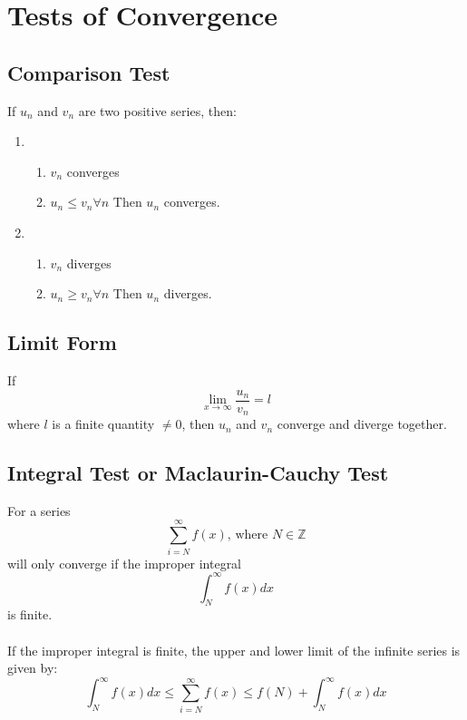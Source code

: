 \documentclass[openany, oneside]{book}
\begin{document}
\section{Tests of Convergence}
\subsection{Comparison Test}
If $u_n$ and $v_n$ are two positive series, then:
\begin{enumerate}
\item \begin{enumerate}
\item $v_n$ converges
\item $u_n\leq v_n \forall n$
Then $u_n$ converges.
\end{enumerate}
\item \begin{enumerate}
\item $v_n$ diverges
\item $u_n\geq v_n \forall n$
Then $u_n$ diverges.
\end{enumerate}
\end{enumerate}

\subsection{Limit Form}
If \begin{equation}\lim_{x\to\infty} \dfrac{u_n}{v_n} = l \nonumber\end{equation} where $l$ is a finite quantity $\neq0$, then $u_n$ and $v_n$ converge and diverge together.

\subsection{Integral Test or Maclaurin-Cauchy Test}
For a series
\begin{equation}
\sum_{i=N}^{\infty} f(x)\text{, where } N\in\mathbb{Z}
\end{equation}
will only converge if the improper integral
\begin{equation}
\int_{N}^{\infty} f(x) dx
\end{equation}
is finite.
\paragraph{}
If the improper integral is finite, the upper and lower limit of the infinite series is given by:
\begin{equation}
\int_{N}^{\infty} f(x) dx \leq \sum_{i=N}^{\infty} f(x) \leq f(N)+\int_{N}^{\infty} f(x) dx
\end{equation}
\end{document}
